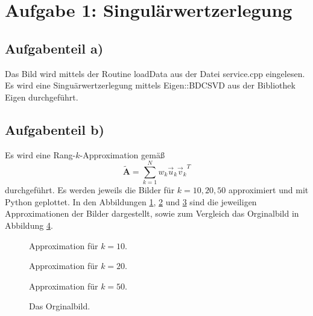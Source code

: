 \section*{Aufgabe 1: Singulärwertzerlegung}

\subsection*{Aufgabenteil a)}
Das Bild wird mittels der Routine loadData aus der Datei service.cpp eingelesen.
Es wird eine Singuärwertzerlegung mittels Eigen::BDCSVD aus der Bibliothek Eigen durchgeführt.

\subsection*{Aufgabenteil b)}

Es wird eine Rang-$k$-Approximation gemäß
\begin{equation}
  \symbf{\tilde{A}} = \sum_{k=1}^N w_k \vec{u}_k {\vec{v}_k}^T
\end{equation}
durchgeführt.
Es werden jeweils die Bilder für $k=10,20,50$ approximiert und mit Python geplottet.
In den Abbildungen \ref{fig:k10}, \ref{fig:k20} und \ref{fig:k50} sind die jeweiligen Approximationen der Bilder dargestellt, sowie zum Vergleich das
Orginalbild in Abbildung \ref{fig:Original}.

\begin{figure}[H]
  \centering
  \caption{Approximation für $k=10$.}
  \label{fig:k10}
\end{figure}


\begin{figure}[H]
  \centering
  \caption{Approximation für $k=20$.}
  \label{fig:k20}
\end{figure}

\begin{figure}[H]
  \centering
  \caption{Approximation für $k=50$.}
  \label{fig:k50}
\end{figure}


\begin{figure}[H]
  \centering
  \caption{Das Orginalbild.}
  \label{fig:Original}
\end{figure}

